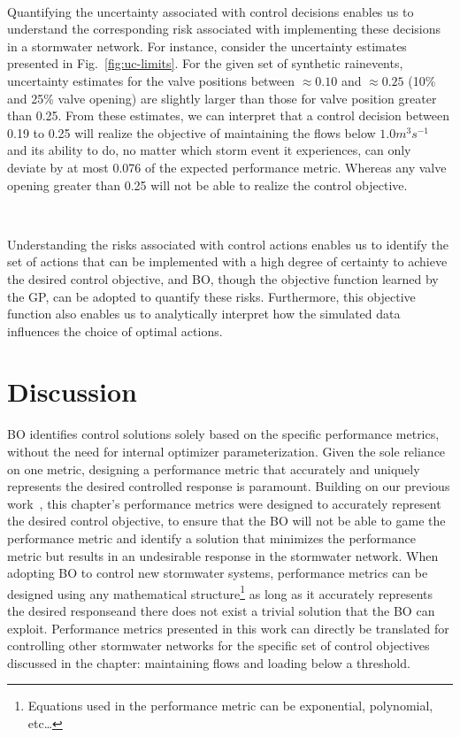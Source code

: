 \


Quantifying the uncertainty associated with control decisions enables us to understand the corresponding risk associated with implementing these decisions in a stormwater network. 
For instance, consider the uncertainty estimates presented in Fig.~\ref{fig:uc-limits}.
For the given set of synthetic rainevents, uncertainty estimates for the valve positions between $\approx0.10$ and $\approx0.25$ (10\% and 25\% valve opening) are slightly larger than those for valve position greater than 0.25.  
From these estimates, we can interpret that a control decision between 0.19 to 0.25 will realize the objective of maintaining the flows below $1.0 m^3 s^{-1}$ and its ability to do, no matter which storm event it experiences, can only deviate by at most 0.076 of the expected performance metric.
Whereas any valve opening greater than 0.25 will not be able to realize the control objective.


\

Understanding the risks associated with control actions enables us to identify the set of actions that can be implemented with a high degree of certainty to achieve the desired control objective, and BO, though the objective function learned by the GP, can be adopted to quantify these risks. 
Furthermore, this objective function also enables us to analytically interpret how the simulated data influences the  choice of optimal actions.

\section{Discussion}
BO identifies control solutions solely based on the specific performance metrics, without the need for internal optimizer parameterization.
Given the sole reliance on one metric, designing a performance metric that accurately and uniquely represents the desired controlled response is paramount.
Building on our previous work~\cite{Mullapudi_Lewis_Gruden_Kerkez_2020}, this chapter's performance metrics were designed to accurately represent the desired control objective, to ensure that the BO will not be able to game the performance metric and identify a solution that minimizes the performance metric but results in an undesirable response in the stormwater network.
When adopting BO to control new stormwater systems, performance metrics can be designed using any mathematical structure\footnote{Equations used in the performance metric can be exponential, polynomial, etc\ldots} as long as it accurately represents the desired responseand there does not exist a trivial solution that the BO can exploit.
Performance metrics presented in this work can directly be translated for controlling other stormwater networks for the specific set of control objectives discussed in the chapter: maintaining flows and loading below a threshold.

